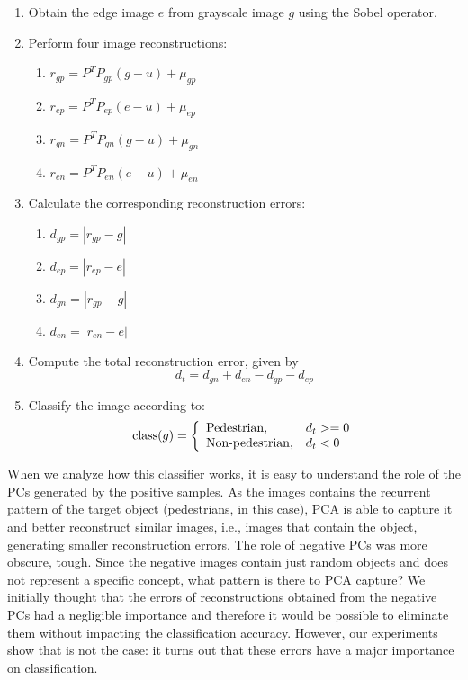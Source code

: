 \documentclass[10pt, conference, compsocconf]{IEEEtran}
\begin{document}
\begin{enumerate}
  \item Obtain the edge image $e$ from grayscale image $g$ using the Sobel operator.
  \item Perform four image reconstructions:
    \begin{enumerate}
      \item $r_{gp} = P^T P_{gp}(g-u) + \mu_{gp}$
      \item $r_{ep} = P^T P_{ep}(e-u) + \mu_{ep}$
      \item $r_{gn} = P^T P_{gn}(g-u) + \mu_{gn}$
      \item $r_{en} = P^T P_{en}(e-u) + \mu_{en}$
    \end{enumerate}
  \item Calculate the corresponding reconstruction errors:
    \begin{enumerate}
      \item $d_{gp} = |r_{gp} - g|$
      \item $d_{ep} = |r_{ep} - e|$
      \item $d_{gn} = |r_{gp} - g|$
      \item $d_{en} = |r_{en} - e|$
    \end{enumerate}
  \item Compute the total reconstruction error, given by
    \begin{equation}
      d_t = d_{gn} + d_{en} - d_{gp} - d_{ep}
      \label{total_error}
    \end{equation}
  \item Classify the image according to:
    \begin{equation}
      \textrm{class}(g) = \left\{
        \begin{array}{l l}
         \textrm{Pedestrian}, & d_t >= 0\\
         \textrm{Non-pedestrian}, & d_t < 0
        \end{array}
      \right.
    \end{equation}
  
\end{enumerate}

When we analyze how this classifier works, it is easy to understand the role of the PCs generated by the positive samples. As the images contains the recurrent pattern of the target object (pedestrians, in this case), PCA is able to capture it and better reconstruct similar images, i.e., images that contain the object, generating smaller reconstruction errors. The role of negative PCs was more obscure, tough. Since the negative images contain just random objects and does not represent a specific concept, what pattern is there to PCA capture? We initially thought that the errors of reconstructions obtained from the negative PCs had a negligible importance and therefore it would be possible to eliminate them without impacting the classification accuracy. However, our experiments show that is not the case: it turns out that these errors have a major importance on classification.
\end{document}
